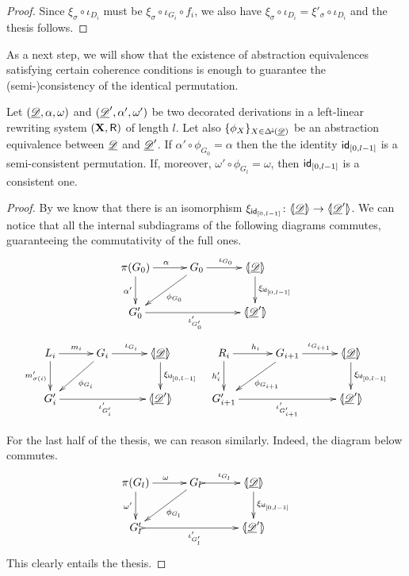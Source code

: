 \begin{proof}
	Since $\xi_\sigma \circ \iota_{D_i}$ must be $\xi_\sigma \circ \iota_{G_i}\circ f_i$, we also have
	$\xi_\sigma \circ \iota_{D_i}=\xi'_\sigma \circ \iota_{D_i}$
	and the thesis follows.
\end{proof}


As a next step, we will show that the existence of abstraction equivalences satisfying certain coherence conditions is enough to guarantee the (semi-)consistency of the identical permutation.

\begin{proposition}\label{rem:abscons}
	Let $(\underline{\mathscr{D}}, \alpha, \omega)$ and $(\underline{\mathscr{D}}', \alpha', \omega')$ be two decorated derivations in a left-linear rewriting system $(\textbf {\textup{X}}, \mathsf{R})$ of length $l$. Let also $\{\phi_X\}_{X\in \Delta^{\hspace{-1pt}\downarrow\hspace{-1pt}}(\underline{\mathscr{D}})}$ be an abstraction equivalence between $\underline{\mathscr{D}}$ and $\underline{\mathscr{D}}'$. If $\alpha'\circ \phi_{G_0}=\alpha$ then the the identity $\mathsf{id}_{[0,l-1]}$ is a semi-consistent permutation. If, moreover, $\omega'\circ \phi_{G_{l}}=\omega$, then $\mathsf{id}_{[0,l-1]}$ is a consistent one.
\end{proposition}
\begin{proof}
By  we know that there is an isomorphism  $\xi_{\mathsf{id}_{[0, l-1]}}\colon \langle \hspace{-1.85pt}[ \underline{\mathscr{D}}]\hspace{-1.85pt}\rangle\to \langle \hspace{-1.85pt}[ \underline{\mathscr{D}}']\hspace{-1.85pt}\rangle$.  We can notice that all the internal subdiagrams of the following diagrams commutes, guaranteeing the commutativity of the full ones.
\[\xymatrix@C=30pt{\pi(G_0)\ar[r]^{\alpha} \ar[d]_{\alpha'} & G_0 \ar[dl]^{\phi_{G_0}} \ar[r]^{\iota_{G_0}} &\tpro{D} \ar[d]^{\xi_{\id{[0, l-1]}}}\\ G'_0 \ar[rr]_{\iota'_{G'_0}} & &\lpro \der{D}' \rpro}\]
\[\xymatrix@C=30pt{L_i \ar[r]^{m_i} \ar[d]_{m'_{\sigma(i)}}& G_i \ar[dl]^{\phi_{G_i}} \ar[r]^{\iota_{G_i}} &\tpro{D} \ar[d]^{\xi_{\id{[0, l-1]}}} & R_i \ar[r]^{h_i} \ar[d]_{h'_{i}}& G_{i+1} \ar[dl]^{\phi_{G_{i+1}}}\ar[r]^{\iota_{G_{i+1}}} &\tpro{D} \ar[d]^{\xi_{\id{[0, l-1]}}} \\G'_{i} \ar[rr]_{\iota'_{G'_{i}}}&& \lpro \der{D}' \rpro& G'_{i+1} \ar[rr]_{\iota'_{G'_{i+1}}}&& \lpro \der{D}' \rpro}\]

For the last half of the thesis, we can reason similarly. Indeed, the diagram below commutes.
\[\xymatrix@C=30pt{\pi(G_l)\ar[r]^{\omega} \ar[d]_{\omega'} & G_l \ar[dl]^{\phi_{G_l}} \ar@{>->}[r]^{\iota_{G_l}} &\tpro{D} \ar[d]^{\xi_{\id{[0, l-1]}}}\\ G'_l \ar@{>->}[rr]_{\iota'_{G'_l}} & &\lpro \der{D}' \rpro}\]
This clearly entails the thesis.
\end{proof}

